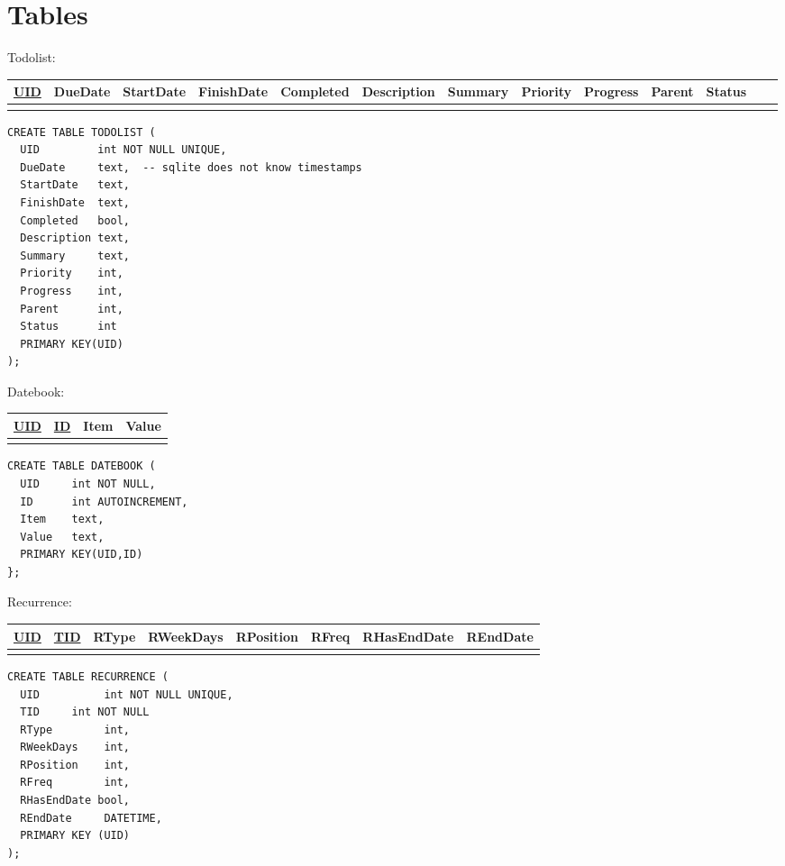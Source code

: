 \pagebreak

\section{Tables}

\noindent
Todolist:\\
\begin{tabular}[ht]{|l|l|l|l|l|l|l|l|l|l|l|l|l|}
\hline
\underline{UID} & DueDate & StartDate & FinishDate & Completed & Description & Summary & Priority & Progress & Parent & Status \\
\hline
 & & & & & & & & & & & &\\
\hline
\end{tabular}
\begin{verbatim}
CREATE TABLE TODOLIST (
  UID         int NOT NULL UNIQUE,
  DueDate     text,  -- sqlite does not know timestamps
  StartDate   text,
  FinishDate  text,
  Completed   bool,
  Description text,
  Summary     text,
  Priority    int,
  Progress    int,
  Parent      int,
  Status      int
  PRIMARY KEY(UID)
);      
\end{verbatim}


\noindent
Datebook: \\
\begin{tabular}[ht]{|l|l|l|l|}
\hline
\underline{UID} & \underline{ID} & Item & Value\\
\hline
 & & & \\
\hline
\end{tabular}

\begin{verbatim}
CREATE TABLE DATEBOOK (
  UID     int NOT NULL,
  ID      int AUTOINCREMENT,
  Item    text,
  Value   text,
  PRIMARY KEY(UID,ID)
};
\end{verbatim} 


\noindent
Recurrence:\\
\begin{tabular}[ht]{|l|l|l|l|l|l|l|l|}
\hline
\underline{UID} & \underline{TID} & RType & RWeekDays & RPosition & RFreq & RHasEndDate &REndDate  \\
\hline
 & & & & & & &\\
\hline
\end{tabular}
\begin{verbatim}
CREATE TABLE RECURRENCE (
  UID          int NOT NULL UNIQUE,
  TID     int NOT NULL
  RType        int,
  RWeekDays    int,
  RPosition    int,
  RFreq        int,
  RHasEndDate bool,
  REndDate     DATETIME,
  PRIMARY KEY (UID)
);
\end{verbatim}

